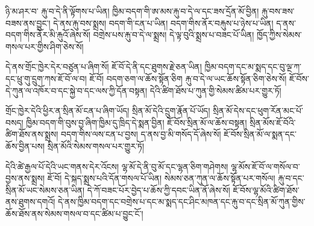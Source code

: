 \documentclass[12pt]{nextbook}
\begin{document}
\begin{readersection}{ཉི་མ་ཤར་བ་}
རྐུ་བ་དེ་ནི་ལྟོགས་པ་ཡིན། ཁྱིམ་བདག་གི་ཨ་མས་རྐུ་བ་དེ་ལ་དང་ཟས་དྲོན་མོ་བྱིན། རྐུ་བས་ཟས་བཟས་ནས་བྱུང་། དེ་ནས་རྐུ་བས་སྨྲས། བདག་གི་ངན་པ་ཡིན། བདག་གིས་ནོར་བརྐུས་པ་ཉེས་པ་ཡིན། ད་ནས་བདག་གིས་ནོར་མི་རྐུའོ་ཞེས་སོ། བགྲེས་པས་རྐུ་བ་དེ་ལ་སྨྲས། དེ་ལྟ་བུའི་སྨྲས་པ་བཟང་པོ་ཡིན། ཁྱོད་ཀྱིས་སེམས་གསལ་པར་གྱིས་ཤིག་ཅེས་སོ།

དེ་ནས་གྲོང་ཁྱེར་དེར་བཙུན་པ་ཞིག་སོ། ཇོ་བོ་དེ་ནི་དང་ཐུགས་རྗེ་ཅན་ཡིན། ཁྱིམ་བདག་དང་མ་སྨད་དང་བུ་ལྔ་ཀ་དང་ཕྲུ་གུ་དྲུག་ཀས་ཇོ་བོ་ལ་བ། ཇོ་བོ། བདག་ཅག་ལ་ཆོས་སྟོན་ཅིག རྐུ་བ་དེ་ལ་ཡང་ཆོས་སྟོན་ཅིག་ཅེས་སོ། ཇོ་བོས་དེ་ཀུན་ལ་འཁོར་བ་དང་སྐྱེ་བ་དང་ལས་ཀྱི་དོན་བསྟན། དེའི་ཚིག་ཐོས་པ་ཀུན་གྱི་སེམས་ཚིམ་པར་གྱུར་ཏོ།

གྲོང་ཁྱེར་དེའི་ཕྱིར་ན་སྲིན་མོ་ངན་པ་ཞིག་ཡོད། སྲིན་མོ་དེའི་དྲུག་རྣོན་པོ་ཡོད། སྲིན་མོ་དེས་དང་ཕུག་རོན་མང་པོ་བསད། ཁྱིམ་བདག་གི་བུས་བྱ་ཞིག་ཁྱིམ་དུ་ཁྲིད་དེ་སྨན་བྱིན། ཇོ་བོས་སྲིན་མོ་ལ་ཆོས་བསྟན། སྲིན་མོས་ཇོ་བོའི་ཚིག་ཐོས་ནས་སྨྲས། བདག་གིས་ལས་ངན་པ་བྱས། ད་ནས་བྱ་མི་གསོད་དོ་ཞེས་སོ། ཇོ་བོས་སྲིན་མོ་ལ་སྨན་དང་ཆོས་བྱིན་པས། སྲིན་མོའི་སེམས་གསལ་པར་གྱུར་ཏོ།

དེའི་ཚེ་རྒྱལ་པོ་དེའི་ཡང་གནས་དེར་འོངས། ལྷ་མོ་དེ་ནི་བུ་མོ་དང་ལྷན་ཅིག་གཤེགས། ལྷ་མོས་ཇོ་བོ་ལ་གསོལ་བ་བྱས་ནས་སྨྲས། ཇོ་བོ། དེ་སྐད་སྨྲས་པའི་དོན་གསལ་པོ་ཡིན། སེམས་ཅན་ཀུན་ལ་ཆོས་སྟོན་པར་གསོལ། རྐུ་བ་དང་སྲིན་མོ་ཡང་སེམས་ཅན་ཡིན། དེ་ཀོ་བཟང་པོར་བྱེད་པ་ཆོས་ཀྱི་དབང་ཡིན་ནོ་ཞེས་སོ། ཇོ་བོས་ལྷ་མོའི་ཚིག་ཐོས་ནས་ཐུགས་དགའོ། དེ་ནས་ཁྱིམ་བདག་དང་བགྲེས་པ་དང་མ་སྨད་དང་ཤིང་མཁན་དང་རྐུ་བ་དང་སྲིན་མོ་ཀུན་གྱིས་ཆོས་ཐོས་ནས་སེམས་གསལ་བ་དང་ཚིམ་པ་བྱུང་ངོ་།
\end{readersection}
\end{document}
